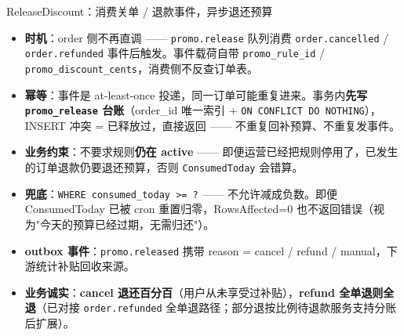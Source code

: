 \documentclass[aspectratio=169,11pt]{beamer}
\begin{document}
\begin{frame}[shrink]{ReleaseDiscount：消费关单 / 退款事件，异步退还预算}
\begin{itemize}
  \item \textbf{时机}：order 侧不再直调 —— \texttt{promo.release} 队列消费 \texttt{order.cancelled} / \texttt{order.refunded} 事件后触发。事件载荷自带 \texttt{promo\_rule\_id} / \texttt{promo\_discount\_cents}，消费侧不反查订单表。
  \item \textbf{幂等}：事件是 at-least-once 投递，同一订单可能重复进来。事务内\textbf{先写 \texttt{promo\_release} 台账}（order\_id 唯一索引 + \texttt{ON CONFLICT DO NOTHING}），INSERT 冲突 = 已释放过，直接返回 —— 不重复回补预算、不重复发事件。
  \item \textbf{业务约束}：不要求规则\textbf{仍在 active} —— 即便运营已经把规则停用了，已发生的订单退款仍要退还预算，否则 \texttt{ConsumedToday} 会错算。
  \item \textbf{兜底}：\texttt{WHERE consumed\_today >= ?} —— 不允许减成负数。即便 ConsumedToday 已被 cron 重置归零，RowsAffected=0 也不返回错误（视为"今天的预算已经过期，无需归还"）。
  \item \textbf{outbox 事件}：\texttt{promo.released} 携带 reason = cancel / refund / manual，下游统计补贴回收来源。
  \item \textbf{业务诚实}：\textbf{cancel 退还百分百}（用户从未享受过补贴），\textbf{refund 全单退则全退}（已对接 \texttt{order.refunded} 全单退路径；部分退按比例待退款服务支持分账后扩展）。
\end{itemize}
\end{frame}
\end{document}
